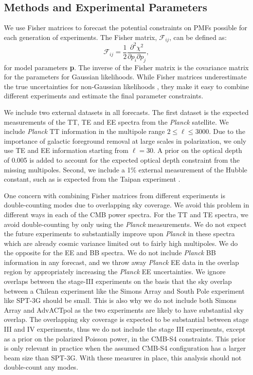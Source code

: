 \documentclass[apj]{emulateapj}
\newcommand{\be}{\begin{equation}}
\newcommand{\ee}{\end{equation}}
\newcommand{\planck}{{\sl Planck}}
\begin{document}
\subsection{Methods and Experimental Parameters}

We use Fisher matrices to forecast the potential constraints on PMFs possible for each generation of experiments. 
The Fisher matrix, $\mathcal{F}_{ij}$, can be defined as:
\be
\mathcal{F}_{ij} = \frac{1}{2} \frac{\partial^2 \chi^2}{\partial p_i \partial p_j},
\ee
for model parameters \textbf{p}. 
The inverse of the Fisher matrix is the covariance matrix for the parameters for Gaussian likelihoods. 
While Fisher matrices underestimate the true uncertainties for non-Gaussian likelihoods \citep[see e.g.,][]{wolz12}, they 
 make it easy to combine different experiments and estimate the final parameter constraints.  


We include two external datasets in all forecasts. 
The first dataset is the expected measurements of the  TT, TE and EE spectra from the \planck{} satellite. 
We include \planck{} TT information in the multipole range $2\le \ell \le 3000$. 
Due to the importance of galactic foreground removal at large scales in polarization, we only use TE and EE information starting from $\ell = 30$. 
A prior on the optical depth of 0.005 is added to account for the expected optical depth constraint from the missing multipoles. 
Second, we include a 1\% external measurement of the Hubble constant, such as is expected from the Taipan experiment \citep{kuehn14}. 

One concern with combining Fisher matrices from different experiments is double-counting modes due to overlapping sky coverage. 
We avoid this problem in different ways in each of the CMB power spectra. 
For the TT and TE spectra, we avoid double-counting by only using the \planck{} measurements. 
We do not expect the future experiments to substantially improve upon \planck{} in these spectra which are already cosmic variance limited out to fairly high multipoles. 
We do the opposite for the EE and BB spectra. 
We do not include \planck{} BB information in any forecast, and we throw away \planck{} EE data in the overlap region by appropriately increasing the \planck{} EE uncertainties. 
We ignore overlaps between the stage-III experiments  on the basis that the sky overlap between a Chilean experiment like the Simons Array and South Pole experiment like SPT-3G should be small. 
This is also why we do not include both Simons Array and AdvACTpol as the two experiments are likely to have substantial sky overlap. 
The overlapping sky coverage is expected to be substantial between stage III and IV experiments, thus we do not include the stage III experiments, except as a prior on the polarized Poisson power, in the CMB-S4 constraints. 
This prior is only relevant in practice when the assumed CMB-S4 configuration has a larger beam size than SPT-3G. 
With these measures in place, this analysis should not double-count any modes. 
\end{document}
